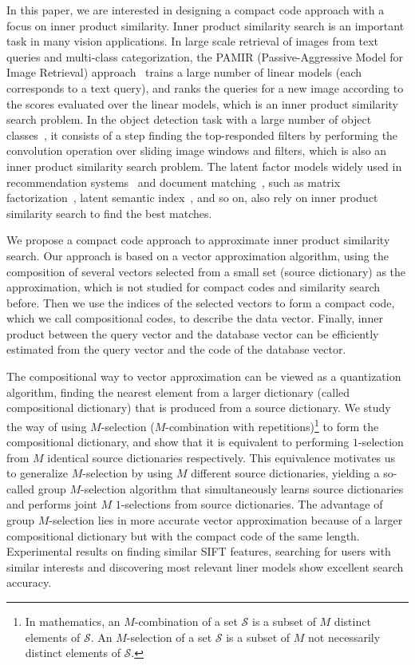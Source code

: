 \documentclass[10pt, letterpaper]{article}
\begin{document}
In this paper, we are interested in
designing a compact code approach
with a focus on inner product similarity.
Inner product similarity search is an important task
in many vision applications.
In large scale retrieval of images from text queries
and multi-class categorization,
the PAMIR (Passive-Aggressive Model for Image
Retrieval) approach~\cite{GrangierB08}
trains a large number of linear models
(each corresponds to a text query),
and ranks the queries for a new image
according to the scores
evaluated over the linear models,
which is an inner product similarity search problem.
In the object detection task
with a large number of object classes~\cite{DeanRSSVY13},
it consists of a step finding the top-responded filters
by performing the convolution operation over sliding image windows
and filters,
which is also an inner product similarity search problem.
The latent factor models
widely used in recommendation systems~\cite{KorenBV09}
and document matching~\cite{BayardoMS07},
such as matrix factorization~\cite{KorenBV09},
latent semantic index~\cite{DeerwesterDLFH90},
and so on,
also rely on inner product similarity search
to find the best matches.



We propose a compact code approach
to approximate inner product similarity search.
Our approach is based on a vector approximation algorithm,
using the composition of several vectors selected
from a small set (source dictionary) as the approximation,
which is not studied for compact codes and similarity search before.
Then we use the indices of the selected vectors
to form a compact code,
which we call compositional codes,
to describe the data vector.
Finally, inner product between the query vector and the database vector
can be efficiently estimated
from the query vector and the code of the database vector.


The compositional way to vector approximation
can be viewed as a quantization algorithm,
finding the nearest element
from a larger dictionary (called compositional dictionary)
that is produced
from a source dictionary.
We study the way of
using $M$-selection ($M$-combination with repetitions)\footnote{In mathematics,
an $M$-combination of a set $\mathcal{S}$ is a subset of $M$ distinct elements of $\mathcal{S}$.
An $M$-selection of a set $\mathcal{S}$ is a subset of $M$ not necessarily distinct elements of $\mathcal{S}$.}
to form the compositional dictionary,
and show that it is equivalent to
performing $1$-selection
from $M$ identical source dictionaries respectively.
This equivalence motivates us to generalize $M$-selection
by using $M$ different source dictionaries,
yielding a so-called group $M$-selection algorithm
that simultaneously learns source dictionaries
and performs joint $M$ $1$-selections from source dictionaries.
The advantage of group $M$-selection lies in
more accurate vector approximation
because of a larger compositional dictionary
but with the compact code of the same length.
Experimental results on finding similar SIFT features,
searching for users with similar interests
and discovering most relevant liner models
show excellent search accuracy.
\end{document}
